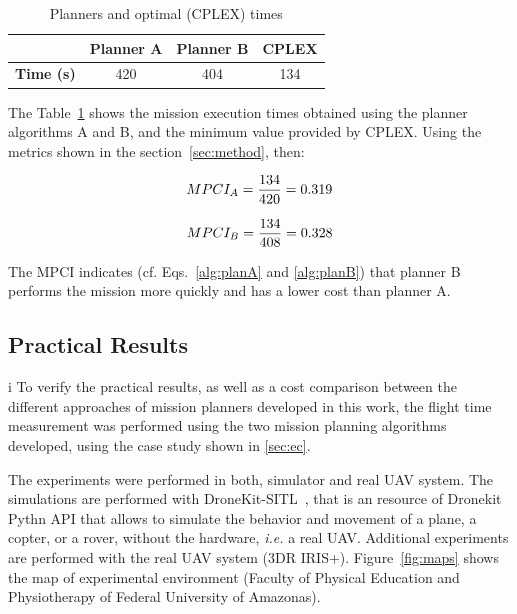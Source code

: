 \documentclass[conference,harvard,brazil,english]{sbatex}
\begin{document}
\begin{table}[H]
\centering
\footnotesize

\begin{tabular}{c|c|c|c|}
\cline{2-4}
                                        & \textbf{Planner A} & \textbf{Planner B} & \textbf{CPLEX} \\ \hline
\multicolumn{1}{|c|}{\textbf{Time (s)}} & 420                & 404                & 134            \\ \hline
\end{tabular}
\caption{Planners and optimal (CPLEX) times}
\label{fig:comp}
\end{table}

The Table~\ref{fig:comp} shows the mission execution times obtained using the planner algorithms A and B, and the minimum value provided by CPLEX. Using the metrics shown in the section~\ref{sec:method}, then:

\begin{equation}
\small
MPCI_A=\frac{134}{420}=0.319
\label{eq1}
\end{equation}


\begin{equation}
\small
MPCI_B=\frac{134}{408}=0.328
\label{eq2}
\end{equation}

The MPCI indicates (cf. Eqs.~\eqref{alg:planA} and \eqref{alg:planB}) that planner B performs the mission more quickly and has a lower cost than planner A.

\subsection{Practical Results}
i
To verify the practical results, as well as a cost comparison between the different approaches of mission planners developed in this work, the flight time measurement was performed using the two mission planning algorithms developed, using the case study shown in \ref{sec:ec}.

The experiments were performed in both, simulator and real UAV system. The simulations are performed with DroneKit-SITL~\cite{dronekit}, that is an resource of Dronekit Pythn API that allows to simulate the behavior and movement of a plane, a copter, or a rover, without the hardware, {\it i.e.} a real UAV.  Additional experiments are performed with the real UAV system (3DR IRIS+). Figure~\ref{fig:maps} shows the map of experimental environment (Faculty of Physical Education and Physiotherapy of Federal University of Amazonas).
\end{document}
